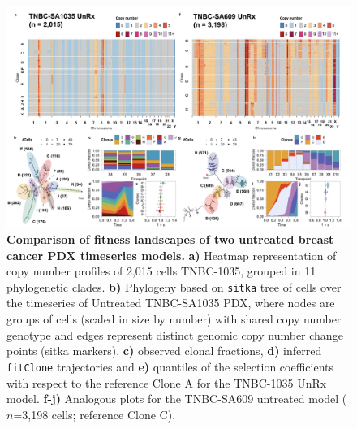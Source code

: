 \begin{figure}
\centering
\includegraphics[width=\textwidth]{Figures/chap4/UnRxseries.png}
	
\caption[Untreated PDX timeseries clonal dynamics at single cell level]
	{\small
	\textbf{Comparison of fitness landscapes of two untreated breast cancer PDX timeseries models.}
	    \textbf{a)} Heatmap representation of copy number profiles of 2,015 cells TNBC-1035, grouped in 11 phylogenetic clades. \textbf{b)} Phylogeny based on \texttt{sitka} tree of cells over the timeseries of Untreated TNBC-SA1035 PDX, where nodes are groups of cells (scaled in size by number) with shared copy number genotype and edges represent distinct genomic copy number change points (sitka markers). \textbf{c)} observed clonal fractions, \textbf{d)} inferred \texttt{fitClone} trajectories and \textbf{e)} quantiles of the selection coefficients with respect to the reference Clone A for the TNBC-1035 UnRx model. \textbf{f-j)} Analogous plots for the TNBC-SA609 untreated model ($n$=3,198 cells; reference Clone C).}
	    
 
 
	\label{fig:SA1035SA609UnRx}
\end{figure}


